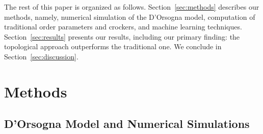 \documentclass[%
 aip,
reprint,
 amsmath,amssymb,
 aps,
showkeys
]{revtex4-1}
\begin{document}
The rest of this paper is organized as follows. Section~\ref{sec:methods} describes our methods, namely, numerical simulation of the D'Orsogna model, computation of traditional order parameters and crockers, and machine learning techniques. Section~\ref{sec:results} presents our results, including our primary finding: the topological approach outperforms the traditional one. We conclude in Section~\ref{sec:discussion}.


\section{\label{sec:methods}Methods}

\subsection{\label{sec:dorsogna}D'Orsogna Model and Numerical Simulations}
\end{document}

